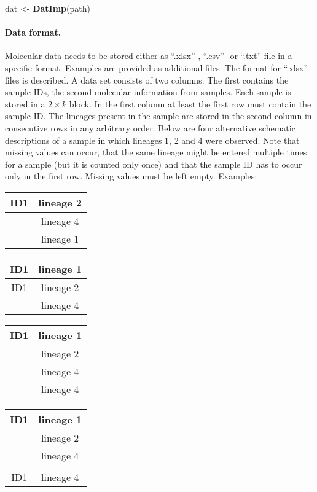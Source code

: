 \documentclass[
]{article}
\newenvironment{Shaded}{\begin{snugshade}}{\end{snugshade}}
\newcommand{\FunctionTok}[1]{\textcolor[rgb]{0.13,0.29,0.53}{\textbf{#1}}}
\newcommand{\NormalTok}[1]{#1}
\newcommand{\OtherTok}[1]{\textcolor[rgb]{0.56,0.35,0.01}{#1}}
\begin{document}
\begin{Shaded}
\begin{Highlighting}[]
\NormalTok{dat }\OtherTok{\textless{}{-}} \FunctionTok{DatImp}\NormalTok{(path)}
\end{Highlighting}
\end{Shaded}

\hypertarget{datform}{%
\paragraph{Data format.}\label{datform}}

Molecular data needs to be stored either as ``.xlsx''-, ``.csv''- or
``.txt''-file in a specific format. Examples are provided as additional
files. The format for ``.xlsx''-files is described. A data set consists
of two columns. The first contains the sample IDs, the second molecular
information from samples. Each sample is stored in a \(2\times k\)
block. In the first column at least the first row must contain the
sample ID. The lineages present in the sample are stored in the second
column in consecutive rows in any arbitrary order. Below are four
alternative schematic descriptions of a sample in which lineages 1, 2
and 4 were observed. Note that missing values can occur, that the same
lineage might be entered multiple times for a sample (but it is counted
only once) and that the sample ID has to occur only in the first row.
Missing values must be left empty. Examples:

\begin{center}
\begin{tabular}{|c|c|}
\hline
ID1 & lineage 2\\\hline
      &  lineage 4\\\hline
      & lineage 1\\\hline
\end{tabular}\quad\quad
\begin{tabular}{|c|c|}
\hline
ID1 & lineage 1\\\hline
ID1      &  lineage 2\\\hline
      & lineage 4\\\hline
\end{tabular}\quad\quad
\begin{tabular}{|c|c|}
\hline
ID1 & lineage 1\\\hline
      &  lineage 2\\\hline
      & lineage 4\\\hline
      & lineage 4\\\hline
\end{tabular}\quad\quad
\begin{tabular}{|c|c|}
\hline
ID1 & lineage 1\\\hline
      &  lineage 2\\\hline
      &  lineage 4\\\hline
      &  \\\hline
ID1   & lineage 4\\\hline
\end{tabular}
\end{center}
\end{document}
